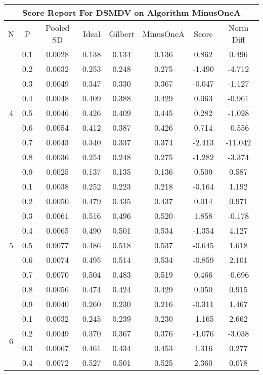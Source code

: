 \documentclass[11pt,a4paper]{report}
\begin{document}
\begin{longtable}{ | c | c || c | c | c | c | c | c | }
\hline
\multicolumn{8}{|c|}{ Score Report For DSMDV on Algorithm MinusOneA} \\
\hline
N & P & Pooled SD &  Ideal &  Gilbert & MinusOneA  & Score & Norm Diff \\
 \hline
 \hline
 \endhead
\multirow{9}{*}{4} & 0.1 & 0.0028 & 0.138 & 0.134 & 0.136 & 0.862 & 0.496 \\
 & 0.2 & 0.0032 & 0.253 & 0.248 & 0.275 & -1.490 & -4.712 \\
 & 0.3 & 0.0049 & 0.347 & 0.330 & 0.367 & -0.047 & -1.127 \\
 & 0.4 & 0.0048 & 0.409 & 0.388 & 0.429 & 0.063 & -0.961 \\
 & 0.5 & 0.0046 & 0.426 & 0.409 & 0.445 & 0.282 & -1.028 \\
 & 0.6 & 0.0054 & 0.412 & 0.387 & 0.426 & 0.714 & -0.556 \\
 & 0.7 & 0.0043 & 0.340 & 0.337 & 0.374 & -2.413 & -11.042 \\
 & 0.8 & 0.0036 & 0.254 & 0.248 & 0.275 & -1.282 & -3.374 \\
 & 0.9 & 0.0025 & 0.137 & 0.135 & 0.136 & 0.509 & 0.587 \\
 \hline
\multirow{9}{*}{5} & 0.1 & 0.0038 & 0.252 & 0.223 & 0.218 & -0.164 & 1.192 \\
 & 0.2 & 0.0050 & 0.479 & 0.435 & 0.437 & 0.014 & 0.971 \\
 & 0.3 & 0.0061 & 0.516 & 0.496 & 0.520 & 1.858 & -0.178 \\
 & 0.4 & 0.0065 & 0.490 & 0.501 & 0.534 & -1.354 & 4.127 \\
 & 0.5 & 0.0077 & 0.486 & 0.518 & 0.537 & -0.645 & 1.618 \\
 & 0.6 & 0.0074 & 0.495 & 0.514 & 0.534 & -0.859 & 2.101 \\
 & 0.7 & 0.0070 & 0.504 & 0.483 & 0.519 & 0.466 & -0.696 \\
 & 0.8 & 0.0056 & 0.474 & 0.424 & 0.429 & 0.050 & 0.915 \\
 & 0.9 & 0.0040 & 0.260 & 0.230 & 0.216 & -0.311 & 1.467 \\
 \hline
\multirow{9}{*}{6} & 0.1 & 0.0032 & 0.245 & 0.239 & 0.230 & -1.165 & 2.662 \\
 & 0.2 & 0.0049 & 0.370 & 0.367 & 0.376 & -1.076 & -3.038 \\
 & 0.3 & 0.0067 & 0.461 & 0.434 & 0.453 & 1.316 & 0.277 \\
 & 0.4 & 0.0072 & 0.527 & 0.501 & 0.525 & 2.360 & 0.078 \\

\end{longtable}
\end{document}
